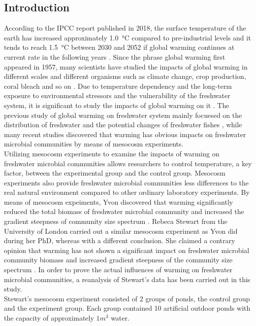 \documentclass[11pt]{article}
\begin{document}
\begin{linenumbers}
\section*{Introduction}
According to the IPCC report published in 2018, the surface temperature of the earth has increased approximately \SI{1.0}{\celsius} compared to pre-industrial levels and it tends to reach \SI{1.5}{\celsius} between 2030 and 2052 if global warming continues at current rate in the following years \cite{IPCC}.
Since the phrase global warming first appeared in 1957, many scientists have studied the impacts of global warming in different scales and different organisms such as climate change, crop production, coral bleach and so on \cite{weart2009discovery}.
Due to temperature dependency and the long-term exposure to environmental stressors and the vulnerability of the freshwater system, it is significant to study the impacts of global warming on it \cite{arnell1996effects}.
The previous study of global warming on freshwater system mainly focuesed on the distribution of freshwater and the potential changes of freshwater fishes \cite{carpenter1992global},
while many recent studies discovered that warming has obvious impacts on freshwater microbial communities by means of mesocosm experiments. \\
Utilizing mesocosm experiments to examine the impacts of warming on freshwater microbial communities allows researchers to control temperature, a key factor, between the experimental group and the control group.
Mesocosm experiments also provide freshwater microbial communities less differences to the real natural environment compared to other ordinary laboratory experiments. By means of mesocosm expeiments, Yvon discovered that warming significantly reduced the total biomass of freshwater microbial community and increased the gradient steepness of community size spectrum \cite{yvon2011warming}.
Rebeca Stewart from the University of London carried out a similar mesocosm experiment as Yvon did during her PhD, whereas with a different conclusion. She claimed a contrary opinion that warming has not shown a significant impact on freshwater microbial community biomass and increased gradient steepness of the community size spectrum \cite{rebecca}.
In order to prove the actual influences of warming on freshwater microbial communities, a reanalysis of Stewart's data has been carried out in this study. \\
Stewart's mesocosm experiment consisted of 2 groups of ponds, the control group and the experiment group. Each group contained 10 artificial outdoor ponds with the capacity of approximately \( 1 m^3\) water.

\end{linenumbers}
\end{document}
